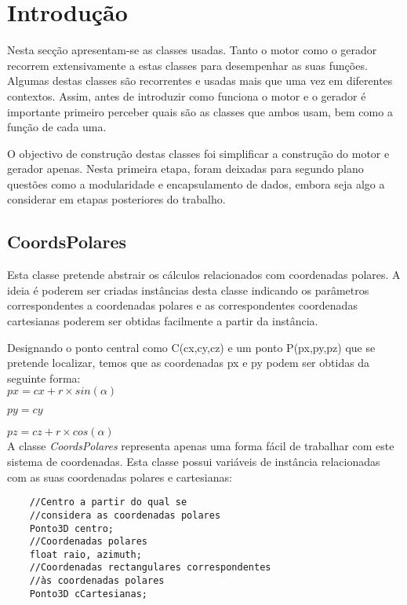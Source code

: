 \chapter{Introdução}
\label{cap:p1}

Nesta secção apresentam-se as classes usadas. Tanto o motor como o gerador recorrem extensivamente a estas classes para desempenhar as suas funções. Algumas destas classes são recorrentes e usadas mais que uma vez em diferentes contextos. Assim, antes de introduzir como funciona o motor e o gerador é importante primeiro perceber quais são as classes que ambos usam, bem como a função de cada uma.

O objectivo de construção destas classes foi simplificar a construção do motor e gerador apenas. Nesta primeira etapa, foram deixadas para segundo plano questões como a modularidade e encapsulamento de dados, embora seja algo a considerar em etapas posteriores do trabalho.


\section{CoordsPolares}
\label{p1:coordsPolares}
Esta classe pretende abstrair os cálculos relacionados com coordenadas polares. A ideia é poderem ser criadas instâncias desta classe indicando os parâmetros correspondentes a coordenadas polares e as correspondentes coordenadas cartesianas poderem ser obtidas facilmente a partir da instância.




Designando o ponto central como C(cx,cy,cz) e um ponto P(px,py,pz) que se pretende localizar, temos que as coordenadas px e py podem ser obtidas da seguinte forma:\\

	$px = cx + r \times sin(\alpha)$
	
	$py = cy$
	
	$pz = cz + r \times cos(\alpha)$\\

A classe \textit{CoordsPolares} representa apenas uma forma fácil de trabalhar com este sistema de coordenadas. Esta classe possui variáveis de instância relacionadas com as suas coordenadas polares e cartesianas:

\begin{Verbatim}
	//Centro a partir do qual se 
	//considera as coordenadas polares
	Ponto3D centro;
	//Coordenadas polares
	float raio, azimuth;
	//Coordenadas rectangulares correspondentes 
	//às coordenadas polares
	Ponto3D cCartesianas;
\end{Verbatim}

